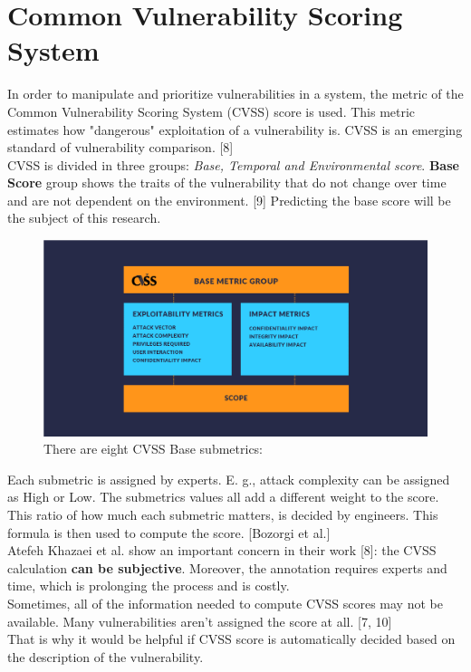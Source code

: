 \documentclass[times, utf8, zavrsni, english]{fer}
\begin{document}
\section{Common Vulnerability Scoring System}
In order to manipulate and prioritize vulnerabilities in a system, the metric of the Common Vulnerability Scoring System (CVSS) score is used. This metric estimates how "dangerous" exploitation of a vulnerability is. CVSS is an emerging standard of vulnerability comparison. [8] \\
CVSS is divided in three groups: \emph{Base, Temporal and Environmental score}. 
\textbf{Base Score} group shows the traits of the vulnerability that do not change over time and are not dependent on the environment. [9] Predicting the base score will be the subject of this research. \\

\begin{figure}[h]
	\caption{There are eight CVSS Base submetrics:}
	\centering
	\includegraphics[scale=0.25]{CVSS-Base-Metric-Group}
\end{figure}
Each submetric is assigned by experts. E. g., attack complexity can be assigned as High or Low. The submetrics values all add a different weight to the score. This ratio of how much each submetric matters, is decided by engineers. This formula is then used to compute the score. [Bozorgi et al.] \\
Atefeh Khazaei et al. show an important concern in their work [8]: the CVSS calculation \textbf{can be subjective}.
Moreover, the annotation requires experts and time, which is prolonging the process and is costly. \\
Sometimes, all of the information needed to compute CVSS scores may not be available. Many vulnerabilities aren't assigned the score at all. [7, 10] \\
That is why it would be helpful if CVSS score is automatically decided based on the description of the vulnerability.
\end{document}

